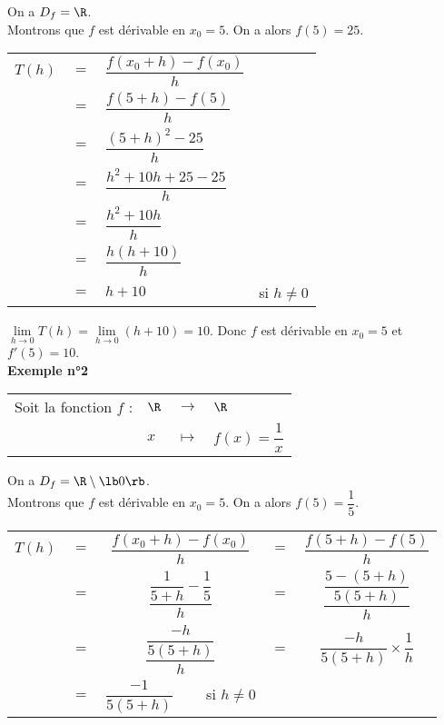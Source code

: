 On a $D_f = \R$. \\

Montrons que $f$ est dérivable en $x_0 = 5$. On a alors $f(5) = 25$. \\

\begin{tabular}{llll}
$T(h)$ & $=$ & $\dfrac{f(x_0 + h) - f(x_0)}{h}$ & \vspace*{.3cm} \\
& $=$ & $\dfrac{f(5 + h) - f(5)}{h}$ & \vspace*{.3cm} \\
& $=$ & $\dfrac{(5+h)^2 - 25}{h}$ & \vspace*{.3cm} \\
& $=$ & $\dfrac{h^2 + 10h + 25 - 25}{h}$ & \vspace*{.3cm} \\
& $=$ & $\dfrac{h^2 + 10h}{h}$ & \vspace*{.3cm} \\
& $=$ & $\dfrac{h\left(h+ 10\right)}{h}$ & \vspace*{.3cm} \\
& $=$ & $ h + 10$ & si $h \neq 0$ \vspace*{.3cm} \\
\end{tabular}

$\lim\limits_{h \to 0} T(h) = \lim\limits_{h \to 0} (h + 10) = 10$. Donc $f$ est dérivable en $x_0 = 5$ et $f'(5) = 10$. \\

\textbf{Exemple n°2} \\

\begin{tabular}{llll}
\hspace{-.3cm} Soit la fonction $f$ : & $\R$ & $\longrightarrow$ & $\R$ \\
& $x$ & $\longmapsto$ & $f\left(x\right) = \dfrac{1}{x}$ \\
\end{tabular}

On a $D_f = \R \setminus \lb 0 \rb$. \\

Montrons que $f$ est dérivable en $x_0 = 5$. On a alors $f(5) = \dfrac{1}{5}$. \\

\begin{tabular}{llclc}
$T(h)$ & $=$ & $\dfrac{f(x_0 + h) - f(x_0)}{h}$ & $=$ & $\dfrac{f(5 + h) - f(5)}{h}$ \vspace*{.3cm} \\
& $=$ & $\dfrac{ \dfrac{1}{5+h} - \dfrac{1}{5}}{h}$ & $=$ & $\dfrac{\dfrac{5-(5+h)}{5(5+h)}}{h}$ \vspace*{.3cm} \\
& $=$ & $\dfrac{\dfrac{-h}{5(5+h)}}{h}$ & $=$ & $\dfrac{-h}{5(5+h)} \times \dfrac{1}{h}$ \vspace*{.3cm} \\
& $=$ & $\dfrac{-1}{5\left(5+h\right)} \; \; \; \; \; \; \; $ si $h \neq 0$ \\
\end{tabular}

